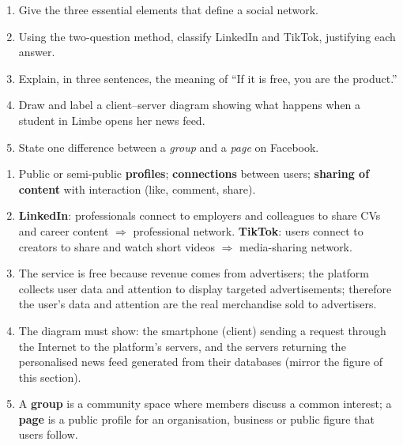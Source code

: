 \documentclass[11pt]{article}
\begin{document}
\begin{exercice}
\begin{enumerate}
\item Give the three essential elements that define a social network.
\item Using the two-question method, classify LinkedIn and TikTok, justifying each answer.
\item Explain, in three sentences, the meaning of ``If it is free, you are the product.''
\item Draw and label a client--server diagram showing what happens when a student in Limbe opens her news feed.
\item State one difference between a \emph{group} and a \emph{page} on Facebook.
\end{enumerate}
\end{exercice}

\begin{corrige}[Exercise 1]
\begin{enumerate}
\item Public or semi-public \textbf{profiles}; \textbf{connections} between users; \textbf{sharing of content} with interaction (like, comment, share).
\item \textbf{LinkedIn}: professionals connect to employers and colleagues to share CVs and career content $\Rightarrow$ professional network. \textbf{TikTok}: users connect to creators to share and watch short videos $\Rightarrow$ media-sharing network.
\item The service is free because revenue comes from advertisers; the platform collects user data and attention to display targeted advertisements; therefore the user's data and attention are the real merchandise sold to advertisers.
\item The diagram must show: the smartphone (client) sending a request through the Internet to the platform's servers, and the servers returning the personalised news feed generated from their databases (mirror the figure of this section).
\item A \textbf{group} is a community space where members discuss a common interest; a \textbf{page} is a public profile for an organisation, business or public figure that users follow.
\end{enumerate}
\end{corrige}
\end{document}
